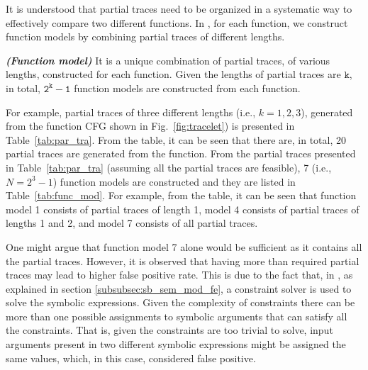 It is understood that partial traces need to be organized in a systematic way to effectively compare two different functions. In \tool, for each function, we construct function models by combining partial traces of different lengths.
\begin{mydef}
\emph{\textbf{(Function model)}} It is a unique combination of partial traces, of various lengths, constructed for each function. Given the lengths of partial traces are $\mathtt{k}$, in total, $\mathtt{2^k-1}$ function models are constructed from each function.
\end{mydef}

For example, partial traces of three different lengths (i.e., $k=1,2,3$), generated from the function CFG shown in Fig.~\ref{fig:tracelet}) is presented in Table~\ref{tab:par_tra}. From the table, it can be seen that there are, in total, 20 partial traces are generated from the function. 
From the partial traces presented in Table~\ref{tab:par_tra} (assuming all the partial traces are feasible), 7 (i.e., $N=2^3-1$) function models are constructed and they are listed in Table~\ref{tab:func_mod}. For example, from the table, it can be seen that function model 1 consists of partial traces of length 1, model 4 consists of partial traces of lengths 1 and 2, and model 7 consists of all partial traces.

One might argue that function model 7 alone would be sufficient as it contains all the partial traces. However, it is observed that having more than required partial traces may lead to higher false positive rate. This is due to the fact that, in \tool, as explained in section \ref{subsubsec:sb_sem_mod_fe}, a constraint solver is used to solve the symbolic expressions. Given the complexity of constraints there can be more than one possible assignments to symbolic arguments that can satisfy all the constraints. That is, given the constraints are too trivial to solve, input arguments present in two different symbolic expressions might be assigned the same values, which, in this case, considered false positive.

